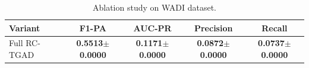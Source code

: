 \begin{table}[h]
\centering
\caption{Ablation study on WADI dataset.}
\label{tab:ablation}
\begin{tabular}{lcccc}
\toprule
\textbf{Variant} & \textbf{F1-PA} & \textbf{AUC-PR} & \textbf{Precision} & \textbf{Recall} \\
\midrule
Full RC-TGAD & \textbf{0.5513$\pm$0.0000} & \textbf{0.1171$\pm$0.0000} & \textbf{0.0872$\pm$0.0000} & \textbf{0.0737$\pm$0.0000} \\
\bottomrule
\end{tabular}
\end{table}